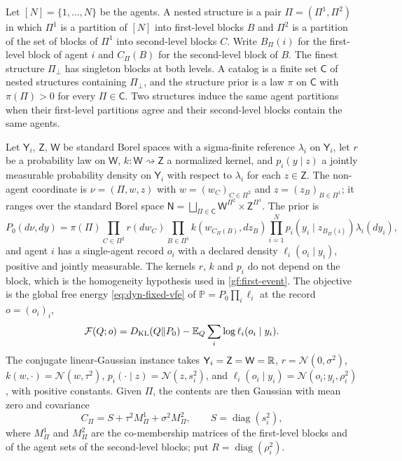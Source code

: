 Let $[N]=\{1,\dots,N\}$ be the agents. A nested structure is a pair
$\Pi=(\Pi^1,\Pi^2)$ in which $\Pi^1$ is a partition of $[N]$ into first-level
blocks $B$ and $\Pi^2$ is a partition of the set of blocks of $\Pi^1$ into
second-level blocks $C$. Write $B_\Pi(i)$ for the first-level block of agent
$i$ and $C_\Pi(B)$ for the second-level block of $B$. The finest structure
$\Pi_\perp$ has singleton blocks at both levels. A catalog is a finite set
$\mathsf C$ of nested structures containing $\Pi_\perp$, and the structure
prior is a law $\pi$ on $\mathsf C$ with $\pi(\Pi)>0$ for every
$\Pi\in\mathsf C$. Two structures induce the same agent partitions when their
first-level partitions agree and their second-level blocks contain the same
agents.

Let $\mathsf Y_i$, $\mathsf Z$, $\mathsf W$ be standard Borel spaces with a
sigma-finite reference $\lambda_i$ on $\mathsf Y_i$, let $r$ be a probability
law on $\mathsf W$, $k:\mathsf W\rightsquigarrow\mathsf Z$ a normalized
kernel, and $p_i(y\mid z)$ a jointly measurable probability density on
$\mathsf Y_i$ with respect to $\lambda_i$ for each $z\in\mathsf Z$. The
non-agent coordinate is $\nu=(\Pi,w,z)$ with $w=(w_C)_{C\in\Pi^2}$ and
$z=(z_B)_{B\in\Pi^1}$; it ranges over the standard Borel space
$\mathsf N=\bigsqcup_{\Pi\in\mathsf C}\mathsf W^{\Pi^2}\times\mathsf Z^{\Pi^1}$.
The prior is
\begin{equation}
 P_0(d\nu,dy)=\pi(\Pi)\prod_{C\in\Pi^2}r(dw_C)
 \prod_{B\in\Pi^1}k(w_{C_\Pi(B)},dz_B)
 \prod_{i=1}^Np_i(y_i\mid z_{B_\Pi(i)})\lambda_i(dy_i),
 \label{gf:prior}
\end{equation}
and agent $i$ has a single-agent record $o_i$ with a declared density
$\ell_i(o_i\mid y_i)$, positive and jointly measurable. The kernels $r$, $k$
and $p_i$ do not depend on the block, which is the homogeneity hypothesis
used in \cref{gf:first-event}. The objective is the global free energy
\cref{eq:dyn-fixed-vfe} of $\mathbb P=P_0\prod_i\ell_i$ at the record
$o=(o_i)_i$,
\begin{equation}
 \mathcal F(Q;o)=D_{\mathrm{KL}}(Q\Vert P_0)-\mathbb E_Q\sum_i\log\ell_i(o_i\mid y_i).
 \label{gf:free-energy}
\end{equation}
The conjugate linear-Gaussian instance takes
$\mathsf Y_i=\mathsf Z=\mathsf W=\mathbb R$, $r=\mathcal N(0,\sigma^2)$,
$k(w,\cdot)=\mathcal N(w,\tau^2)$, $p_i(\cdot\mid z)=\mathcal N(z,s_i^2)$, and
$\ell_i(o_i\mid y_i)=\mathcal N(o_i;y_i,\rho_i^2)$, with positive constants.
Given $\Pi$, the contents are then Gaussian with mean zero and covariance
\begin{equation}
 C_\Pi=S+\tau^2M^1_\Pi+\sigma^2M^2_\Pi,
 \qquad S=\operatorname{diag}(s_i^2),
 \label{gf:covariance}
\end{equation}
where $M^1_\Pi$ and $M^2_\Pi$ are the co-membership matrices of the first-level
blocks and of the agent sets of the second-level blocks; put
$R=\operatorname{diag}(\rho_i^2)$.

